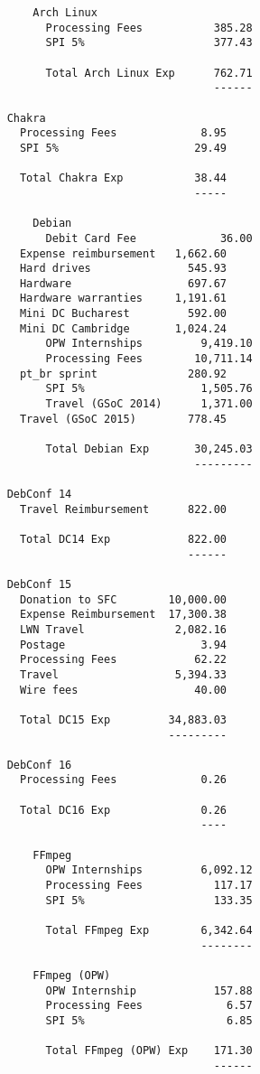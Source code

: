 \documentclass[letterpaper]{report}
\begin{document}
\begin{verbatim}
        Arch Linux
          Processing Fees           385.28
          SPI 5%                    377.43

          Total Arch Linux Exp      762.71
                                    ------

	Chakra
	  Processing Fees             8.95
	  SPI 5%                     29.49

	  Total Chakra Exp           38.44
	                             -----

        Debian
          Debit Card Fee             36.00
	  Expense reimbursement   1,662.60
	  Hard drives               545.93
	  Hardware                  697.67
	  Hardware warranties     1,191.61
	  Mini DC Bucharest         592.00
	  Mini DC Cambridge       1,024.24
          OPW Internships         9,419.10
          Processing Fees        10,711.14
	  pt_br sprint              280.92
          SPI 5%                  1,505.76
          Travel (GSoC 2014)      1,371.00
	  Travel (GSoC 2015)        778.45

          Total Debian Exp       30,245.03
                                 ---------

	DebConf 14
	  Travel Reimbursement      822.00

	  Total DC14 Exp            822.00
	                            ------

	DebConf 15
	  Donation to SFC        10,000.00
	  Expense Reimbursement  17,300.38
	  LWN Travel              2,082.16
	  Postage                     3.94
	  Processing Fees            62.22
	  Travel                  5,394.33
	  Wire fees                  40.00

	  Total DC15 Exp         34,883.03
	                         ---------

	DebConf 16
	  Processing Fees             0.26

	  Total DC16 Exp              0.26
	                              ----

        FFmpeg
          OPW Internships         6,092.12
          Processing Fees           117.17
          SPI 5%                    133.35

          Total FFmpeg Exp        6,342.64
                                  --------

        FFmpeg (OPW)
          OPW Internship            157.88
          Processing Fees             6.57
          SPI 5%                      6.85

          Total FFmpeg (OPW) Exp    171.30
                                    ------


\end{verbatim}
\end{document}
